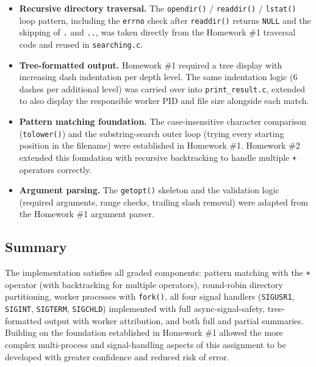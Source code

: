 \documentclass[12pt,a4paper]{article}
\begin{document}
\begin{itemize}
    \item \textbf{Recursive directory traversal.}
          The \texttt{opendir()} / \texttt{readdir()} / \texttt{lstat()} loop
          pattern, including the \texttt{errno} check after \texttt{readdir()}
          returns \texttt{NULL} and the skipping of \texttt{.} and \texttt{..},
          was taken directly from the Homework \#1 traversal code and reused
          in \texttt{searching.c}.

    \item \textbf{Tree-formatted output.}
          Homework \#1 required a tree display with increasing dash indentation
          per depth level. The same indentation logic (6 dashes per additional
          level) was carried over into \texttt{print\_result.c},
          extended to also display the responsible worker PID and file size
          alongside each match.

    \item \textbf{Pattern matching foundation.}
          The case-insensitive character comparison (\texttt{tolower()}) and
          the substring-search outer loop (trying every starting position in
          the filename) were established in Homework \#1. Homework \#2 extended
          this foundation with recursive backtracking to handle multiple
          \texttt{+} operators correctly.

    \item \textbf{Argument parsing.}
          The \texttt{getopt()} skeleton and the validation logic
          (required arguments, range checks, trailing slash removal) were
          adapted from the Homework \#1 argument parser.
\end{itemize}

\subsection{Summary}

The implementation satisfies all graded components: pattern matching with the
\texttt{+} operator (with backtracking for multiple operators), round-robin
directory partitioning, worker processes with \texttt{fork()}, all four signal
handlers (\texttt{SIGUSR1}, \texttt{SIGINT}, \texttt{SIGTERM},
\texttt{SIGCHLD}) implemented with full async-signal-safety, tree-formatted
output with worker attribution, and both full and partial summaries. Building
on the foundation established in Homework \#1 allowed the more complex
multi-process and signal-handling aspects of this assignment to be developed
with greater confidence and reduced risk of error.
\end{document}
